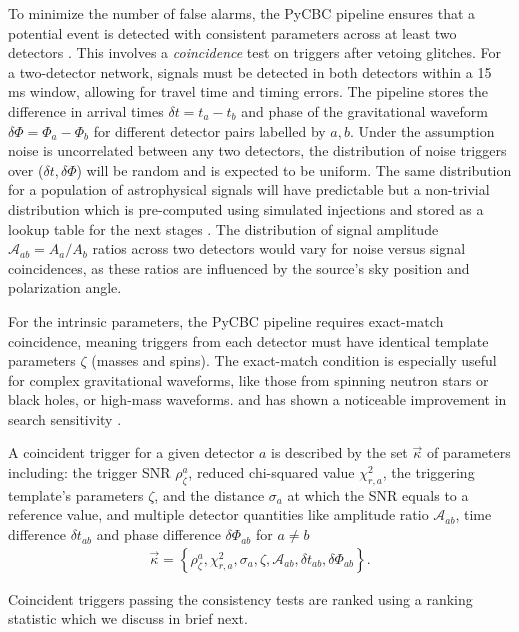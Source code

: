 To minimize the number of false alarms, the PyCBC pipeline ensures that a potential event is detected with consistent parameters across at least two detectors \cite{Davies:2020tsx}. This involves a \textit{coincidence} test on triggers after vetoing glitches. For a two-detector network, signals must be detected in both detectors within a 15 ms window, allowing for travel time and timing errors. The pipeline stores the difference in arrival times $\delta t = t_a - t_b$ and phase of the gravitational waveform $\delta \Phi = \Phi_a - \Phi_b$ for different detector pairs labelled by $a, b$. Under the assumption noise is uncorrelated between any two detectors, the distribution of noise triggers over ($\delta t, \delta \Phi$) will be random and is expected to be uniform. The same distribution for a population of astrophysical signals will have predictable but a non-trivial distribution which is pre-computed using simulated injections and stored as a lookup table for the next stages \cite{Nitz:2017svb}. The distribution of signal amplitude $\mathcal{A}_{ab} = A_{a}/A_b$ ratios across two detectors would vary for noise versus signal coincidences, as these ratios are influenced by the source's sky position and polarization angle. 

For the intrinsic parameters, the PyCBC pipeline requires exact-match coincidence, meaning triggers from each detector must have identical template parameters $\zeta$ (masses and spins). The exact-match condition is especially useful for complex gravitational waveforms, like those from spinning neutron stars or black holes, or high-mass waveforms. and has shown a noticeable improvement in search sensitivity \cite{Nitz:2017svb}. 

A coincident trigger for a given detector $a$ is described by the set $\vec{\kappa}$ of parameters including: the trigger SNR $\rho^a_{\zeta}$, reduced chi-squared value $\chi^2_{r,a}$, the triggering template's parameters $\zeta$, and the distance  $\sigma_a$ at which the SNR equals to a reference value, and multiple detector quantities like amplitude ratio $\mathcal{A}_{ab}$, time difference $\delta t_{ab}$ and phase difference $\delta\Phi_{ab}$ for $a \neq b$
\begin{align}
    \vec{\kappa} = \left\{ \rho^a_{\zeta}, \chi^2_{r,a}, \sigma_a, \zeta, \mathcal{A}_{ab}, \delta t_{ab}, \delta \Phi_{ab} \right\}.
\end{align}

Coincident triggers passing the consistency tests are ranked using a ranking statistic which we discuss in brief next.

